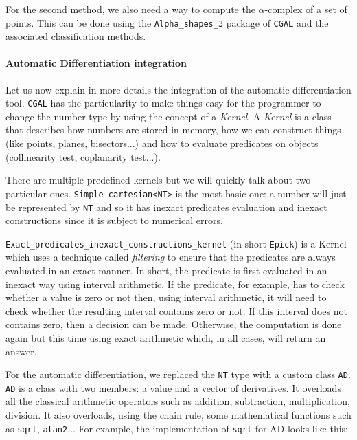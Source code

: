 For the second method, we also need a way to compute the $\alpha$-complex of a
set of points. This can be done using the \texttt{Alpha\_shapes\_3} package of
\texttt{CGAL} and the associated classification methods.

\paragraph{Automatic Differentiation integration}

Let us now explain in more details the integration of the automatic
differentiation tool. \texttt{CGAL} has the particularity to make things easy
for the programmer to change the number type by using the concept of a
\emph{Kernel}. A \emph{Kernel} is a class that describes how numbers are stored
in memory, how we can construct things (like points, planes, bisectors...) and
how to evaluate predicates on objects (collinearity test, coplanarity test...).

There are multiple predefined kernels but we will quickly talk about two
particular ones. \texttt{Simple\_cartesian<NT>} is the most basic one: a number
will just be represented by \texttt{NT} and so it has inexact predicates
evaluation and inexact constructions since it is subject to numerical errors.

\texttt{Exact\_predicates\_inexact\_constructions\_kernel} (in short
\texttt{Epick}) is a Kernel which uses a technique called \emph{filtering} to
ensure that the predicates are always evaluated in an exact manner. In short,
the predicate is first evaluated in an inexact way using interval arithmetic.
If the predicate, for example, has to check whether a value is zero or not then,
using interval arithmetic, it will need to check whether the resulting interval
contains zero or not. If this interval does not contains zero, then a decision
can be made. Otherwise, the computation is done again but this time using exact
arithmetic which, in all cases, will return an answer.

For the automatic differentiation, we replaced the \texttt{NT} type with a
custom class \texttt{AD}. \texttt{AD} is a class with two members: a value and a
vector of derivatives. It overloads all the classical arithmetic operators such
as addition, subtraction, multiplication, division. It also overloads, using the
chain rule, some mathematical functions such as \texttt{sqrt}, \texttt{atan2}...
For example, the implementation of \texttt{sqrt} for AD looks like this:


